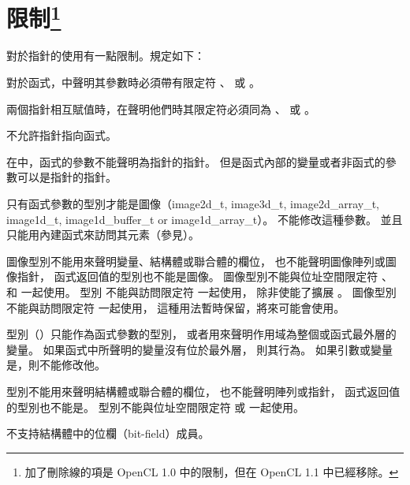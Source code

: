 \section[sec:restrictions]{限制\footnote{
加了刪除線的項是 OpenCL 1.0 中的限制，但在 OpenCL 1.1 中已經移除。}}

\startigBig

\startitem
對於指針的使用有一點限制。規定如下：
\startigBig

\startitem
對於函式，中聲明其參數時必須帶有限定符
 、  或 。
\stopitem

\startitem
兩個指針相互賦值時，在聲明他們時其限定符必須同為
 、  或 。
\stopitem

\startitem
不允許指針指向函式。
\stopitem

\startitem
在中，函式的參數不能聲明為指針的指針。
但是函式內部的變量或者非函式的參數可以是指針的指針。
\stopitem

\stopigBig
\stopitem

\startitem
只有函式參數的型別才能是圖像（image2d_t, image3d_t, image2d_array_t, image1d_t,
image1d_buffer_t or image1d_array_t）。
不能修改這種參數。
並且只能用內建函式來訪問其元素（參見）。

圖像型別不能用來聲明變量、結構體或聯合體的欄位，
也不能聲明圖像陣列或圖像指針，
函式返回值的型別也不能是圖像。
圖像型別不能與位址空間限定符
 、  和  一起使用。
型別  不能與訪問限定符  一起使用，
除非使能了擴展 。
圖像型別不能與訪問限定符  一起使用，
這種用法暫時保留，將來可能會使用。

型別（）只能作為函式參數的型別，
或者用來聲明作用域為整個或函式最外層的變量。
如果函式中所聲明的變量沒有位於最外層，
則其行為。
如果引數或變量是，則不能修改他。

型別不能用來聲明結構體或聯合體的欄位，
也不能聲明陣列或指針，
函式返回值的型別也不能是。
型別不能與位址空間限定符  或  一起使用。
\stopitem

\startitem
不支持結構體中的位欄（bit-field）成員。
\stopitem

